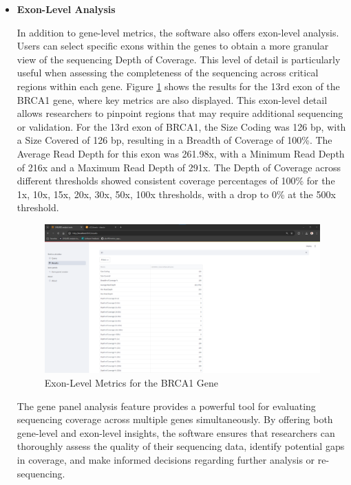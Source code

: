 \begin{itemize}
\item \textbf{Exon-Level Analysis}

In addition to gene-level metrics, the software also offers exon-level analysis. Users can select specific exons within the genes to obtain a more granular view of the sequencing Depth of Coverage. This level of detail is particularly useful when assessing the completeness of the sequencing across critical regions within each gene. Figure \ref{fig:exon_results} shows the results for the 13rd exon of the BRCA1 gene, where key metrics are also displayed. This exon-level detail allows researchers to pinpoint regions that may require additional sequencing or validation. For the 13rd exon of BRCA1, the Size Coding was 126 \ac{bp}, with a Size Covered of 126 \ac{bp}, resulting in a Breadth of Coverage of 100\%. The Average Read Depth for this exon was 261.98x, with a Minimum Read Depth of 216x and a Maximum Read Depth of 291x. The Depth of Coverage across different thresholds showed consistent coverage percentages of 100\% for the 1x, 10x, 15x, 20x, 30x, 50x, 100x thresholds, with a drop to 0\% at the 500x threshold.

\begin{figure}[H]
    \centering
    \includegraphics[width=\textwidth]{figs/v3.12.png}
    \caption{Exon-Level Metrics for the BRCA1 Gene}
    \label{fig:exon_results}
\end{figure}

The gene panel analysis feature provides a powerful tool for evaluating sequencing coverage across multiple genes simultaneously. By offering both gene-level and exon-level insights, the software ensures that researchers can thoroughly assess the quality of their sequencing data, identify potential gaps in coverage, and make informed decisions regarding further analysis or re-sequencing.

\end{itemize}

